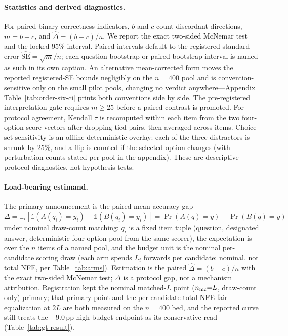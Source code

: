 \documentclass{article}
\newcommand{\pp}{\,\mathrm{pp}}
\newcommand{\EE}{\mathbb{E}}
\newcommand{\II}{\mathbb{1}}
\begin{document}
\paragraph{Statistics and derived diagnostics.}
For paired binary correctness indicators, $b$ and $c$ count discordant directions,
$m=b+c$, and $\widehat\Delta=(b-c)/n$.  We report the exact two-sided McNemar
test \citep{mcnemar1947} and the locked 95\% interval.  Paired intervals default
to the registered standard error $\widehat{\mathrm{SE}}=\sqrt{m}/n$; each
question-bootstrap or paired-bootstrap interval is named as such in its own
caption.  An
alternative mean-corrected form moves the reported registered-SE bounds
negligibly on the $n=400$ pool and is convention-sensitive only on the small
pilot pools, changing no verdict anywhere---Appendix
Table~\ref{tab:order-six-ci} prints both conventions side by side.  The
pre-registered interpretation gate requires $m\geq25$ before a paired contrast
is promoted.  For protocol agreement, Kendall
$\tau$ \citep{kendall1938} is recomputed within each item from the two
four-option score vectors after dropping tied pairs, then averaged across
items.  Choice-set sensitivity is an offline deterministic overlay: each of
the three distractors is shrunk by 25\%, and a flip is counted if the selected
option changes (with perturbation counts stated per pool in the appendix).
These are descriptive protocol diagnostics, not hypothesis tests.

\paragraph{Load-bearing estimand.}
The primary announcement is the paired mean accuracy gap
$\Delta=\EE_i[\II(A(q_i){=}y_i){-}\II(B(q_i){=}y_i)]=\Pr(A(q){=}y){-}\Pr(B(q){=}y)$
under nominal draw-count matching: $q_i$ is a fixed item tuple (question,
designated answer, deterministic four-option pool from the same scorer), the
expectation is over the $n$ items of a named pool, and the budget unit is the
nominal per-candidate scoring draw (each arm spends $L_i$ forwards per
candidate; nominal, not total NFE, per Table~\ref{tab:arms}).  Estimation is
the paired $\widehat\Delta=(b-c)/n$ with the exact two-sided McNemar test;
$\Delta$ is a protocol gap, not a mechanism attribution.  Registration kept
the nominal matched-$L$ point ($n_{\rm mc}{=}L$, draw-count only) primary; that
primary point and the per-candidate total-NFE-fair equalization at $2L$ are
both measured on the $n{=}400$ bed, and the reported curve still treats the
$+9.0\pp$ high-budget endpoint as its conservative read
(Table~\ref{tab:gt-result}).
\end{document}
